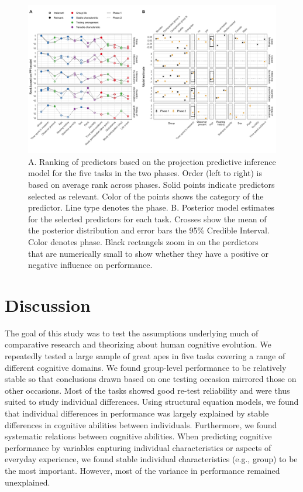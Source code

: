 \documentclass[
  man,floatsintext]{apa6}
\begin{document}
\begin{figure}

{\centering \includegraphics[width=1\linewidth]{./figures/ppi3_i3} 

}

\caption{A. Ranking of predictors based on the projection predictive inference model for the five tasks in the two phases. Order (left to right) is based on average rank across phases. Solid points indicate predictors selected as relevant. Color of the points shows the category of the predictor. Line type denotes the phase. B. Posterior model estimates for the selected predictors for each task. Crosses show the mean of the posterior distribution and error bars the 95\% Credible Interval. Color denotes phase. Black rectangels zoom in on the perdictors that are numerically small to show whether they have a positive or negative influence on performance.}\label{fig:ppiplot}
\end{figure}

\hypertarget{discussion}{%
\section{Discussion}\label{discussion}}

The goal of this study was to test the assumptions underlying much of comparative research and theorizing about human cognitive evolution. We repeatedly tested a large sample of great apes in five tasks covering a range of different cognitive domains. We found group-level performance to be relatively stable so that conclusions drawn based on one testing occasion mirrored those on other occasions. Most of the tasks showed good re-test reliability and were thus suited to study individual differences. Using structural equation models, we found that individual differences in performance was largely explained by stable differences in cognitive abilities between individuals. Furthermore, we found systematic relations between cognitive abilities. When predicting cognitive performance by variables capturing individual characteristics or aspects of everyday experience, we found stable individual characteristics (e.g., group) to be the most important. However, most of the variance in performance remained unexplained.
\end{document}
